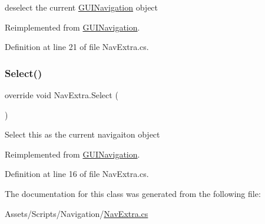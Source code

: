 deselect the current \mbox{\hyperlink{class_g_u_i_navigation}{G\+U\+I\+Navigation}} object 



Reimplemented from \mbox{\hyperlink{class_g_u_i_navigation_a98563f06446b45814ff78978b472e948}{G\+U\+I\+Navigation}}.



Definition at line 21 of file Nav\+Extra.\+cs.

\mbox{\label{class_nav_extra_abebcfc80eaf380a014c7865dc7a7bf8e}} 
\subsubsection{\texorpdfstring{Select()}{Select()}}
{\footnotesize\ttfamily override void Nav\+Extra.\+Select (\begin{DoxyParamCaption}{ }\end{DoxyParamCaption})\hspace{0.3cm}{\ttfamily [virtual]}}



Select this as the current navigaiton object 



Reimplemented from \mbox{\hyperlink{class_g_u_i_navigation_a4c40fc7986ac35247bc8f77c615e7847}{G\+U\+I\+Navigation}}.



Definition at line 16 of file Nav\+Extra.\+cs.



The documentation for this class was generated from the following file\+:\begin{DoxyCompactItemize}
\item 
Assets/\+Scripts/\+Navigation/\mbox{\hyperlink{_nav_extra_8cs}{Nav\+Extra.\+cs}}\end{DoxyCompactItemize}
